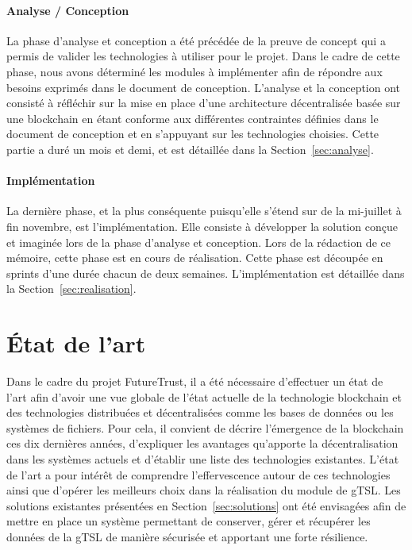 \documentclass{tnreport}
\begin{document}
\subsubsection{Analyse / Conception}

La phase d'analyse et conception a été précédée de la preuve de concept qui a permis de valider les technologies à utiliser pour le projet. Dans le cadre de cette phase, nous avons déterminé les modules à implémenter afin de répondre aux besoins exprimés dans le document de conception. L'analyse et la conception ont consisté à réfléchir sur la mise en place d'une architecture décentralisée basée sur une blockchain en étant conforme aux différentes contraintes définies dans le document de conception et en s'appuyant sur les technologies choisies. Cette partie a duré un mois et demi, et est détaillée dans la Section~\ref{sec:analyse}.

\subsubsection{Implémentation}

La dernière phase, et la plus conséquente puisqu'elle s'étend sur de la mi-juillet à fin novembre, est l'implémentation. Elle consiste à développer la solution conçue et imaginée lors de la phase d'analyse et conception. Lors de la rédaction de ce mémoire, cette phase est en cours de réalisation. Cette phase est découpée en sprints d'une durée chacun de deux semaines. L'implémentation est détaillée dans la Section~\ref{sec:realisation}. 

\chapter{État de l'art}
\label{sec:state-of-the-art}

Dans le cadre du projet FutureTrust, il a été nécessaire d'effectuer un état de l'art afin d'avoir une vue globale de l'état actuelle de la technologie blockchain et des technologies distribuées et décentralisées comme les bases de données ou les systèmes de fichiers. Pour cela, il convient de décrire l'émergence de la blockchain ces dix dernières années, d'expliquer les avantages qu'apporte la décentralisation dans les systèmes actuels et d'établir une liste des technologies existantes. L'état de l'art a pour intérêt de comprendre l'effervescence autour de ces technologies ainsi que d'opérer les meilleurs choix dans la réalisation du module de gTSL. Les solutions existantes présentées en Section~\ref{sec:solutions} ont été envisagées afin de mettre en place un système permettant de conserver, gérer et récupérer les données de la gTSL de manière sécurisée et apportant une forte résilience.
\end{document}
